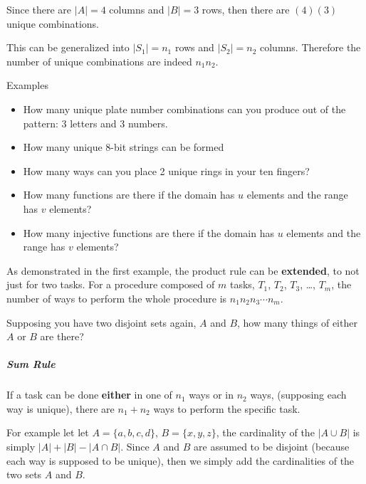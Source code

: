 Since there are \textbf{\(|A|=4\)} columns and \textbf{\(|B|=3\)} rows,
then there are \textbf{\((4)(3)\)} unique combinations.

This can be generalized into \textbf{\(|S_1|=n_1\)} rows and
\textbf{\(|S_2|=n_2\)} columns. Therefore the number of unique
combinations are indeed \textbf{\(n_1 n_2\)}.

Examples

\begin{itemize}
\tightlist
\item
  How many unique plate number combinations can you produce out of the
  pattern: 3 letters and 3 numbers.
\item
  How many unique 8-bit strings can be formed
\item
  How many ways can you place 2 unique rings in your ten fingers?
\item
  How many functions are there if the domain has \textbf{\(u\)} elements
  and the range has \textbf{\(v\)} elements?
\item
  How many injective functions are there if the domain has
  \textbf{\(u\)} elements and the range has \textbf{\(v\)} elements?
\end{itemize}

As demonstrated in the first example, the product rule can be
\textbf{extended}, to not just for two tasks. For a procedure composed
of \textbf{\(m\)} tasks, \textbf{\(T_1\)}, \textbf{\(T_2\)},
\textbf{\(T_3\)}, \ldots, \textbf{\(T_m\)}, the number of ways to
perform the whole procedure is \textbf{\(n_1 n_2 n_3 \cdots n_m\)}.

Supposing you have two disjoint sets again, \textbf{\(A\)} and
\textbf{\(B\)}, how many things of either \textbf{\(A\)} or
\textbf{\(B\)} are there?

\hypertarget{sum-rule}{%
\subparagraph{Sum Rule}\label{sum-rule}}

If a task can be done \textbf{either} in one of \textbf{\(n_1\)} ways or
in \textbf{\(n_2\)} ways, (supposing each way is unique), there are
\textbf{\(n_1 + n_2\)} ways to perform the specific task.

For example let let \textbf{\(A=\{a,b,c,d\}\)},
\textbf{\(B=\{x,y,z\}\)}, the cardinality of the \textbf{\(|A \cup B|\)}
is simply \textbf{\(|A| + |B| - |A \cap B|\)}. Since \textbf{\(A\)} and
\textbf{\(B\)} are assumed to be disjoint (because each way is supposed
to be unique), then we simply add the cardinalities of the two sets
\textbf{\(A\)} and \textbf{\(B\)}.

